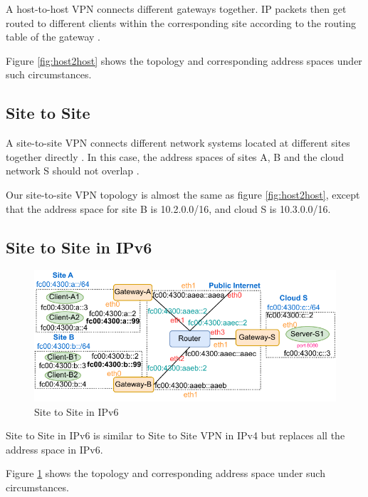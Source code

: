 \documentclass[article]{aaltoseries}
\begin{document}
A host-to-host VPN connects different gateways together. IP packets then get routed to different clients within the corresponding site according to the routing table of the gateway \cite{meng2013implementation}.

Figure \ref{fig:host2host} shows the topology and corresponding address spaces under such circumstances.

\subsection{Site to Site}

A site-to-site VPN connects different network systems located at different sites together directly \cite{9022848}. In this case, the address spaces of sites A, B and the cloud network S should not overlap \cite{AKYILDIZ2023100695}.

Our site-to-site VPN topology is almost the same as figure \ref{fig:host2host}, except that the address space for site B is 10.2.0.0/16, and cloud S is 10.3.0.0/16.

\subsection{Site to Site in IPv6}
\begin{figure}[t!]
  \begin{center}
    \includegraphics[scale=1]{figures/ipv6-site-to-site.pdf}
    \caption{Site to Site in IPv6}
    \label{fig:ipv6site2site}
  \end{center}
\end{figure}

Site to Site in IPv6 is similar to Site to Site VPN in IPv4 but replaces all the address space in IPv6.

Figure \ref{fig:ipv6site2site} shows the topology and corresponding address space under such circumstances.

\end{document}
